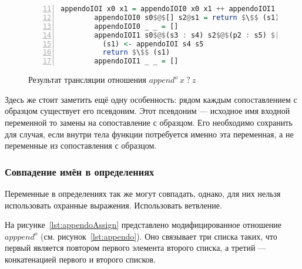 \begin{figure}[h!]
  \begin{center}
  \begin{minipage}{0.9\textwidth}
  \begin{lstlisting}[language=Haskell, frame=single, numbers=left,numberstyle=\small, firstnumber=11, escapechar=|]
        appendoIOI x0 x1 = appendoIOI0 x0 x1 ++ appendoIOI1 x0 x1
        appendoIOI0 s0$@$[] s2@s1 = return $\$$ (s1)
        appendoIOI0 _ _ = []
        appendoIOI1 s0$@$(s3 : s4) s2$@$(p2 : s5) $|$ s3 == p2 = do
          (s1) <- appendoIOI s4 s5
          return $\$$ (s1)
        appendoIOI1 _ _ = []
    \end{lstlisting}
  \end{minipage}
  \end{center}
  \caption{Результат трансляции отношения $append^o \ x \ ? \ z$}
  \label{lst:appendoIOITR}
\end{figure}

Здесь же стоит заметить ещё одну особенность: рядом каждым сопоставлением с образцом существует его псевдоним.
Этот псевдоним --- исходное имя входной переменной то замены на сопоставление с образцом.
Его необходимо сохранить для случая, если внутри тела функции потребуется именно эта переменная, а не переменные из сопоставления с образцом.


\subsubsection{Совпадение имён в определениях}

Переменные в определениях так же могут совпадать, однако, для них нельзя использовать охранные выражения.
Использовать ветвление.

На рисунке~\ref{lst:appendoAssign} представлено модифицированное отношение $apppend^o$ (см. рисунок~\ref{lst:appendo}).
Оно связывает три списка таких, что первый является повтором первого элемента второго списка, а третий --- конкатенацией первого и второго списков.

